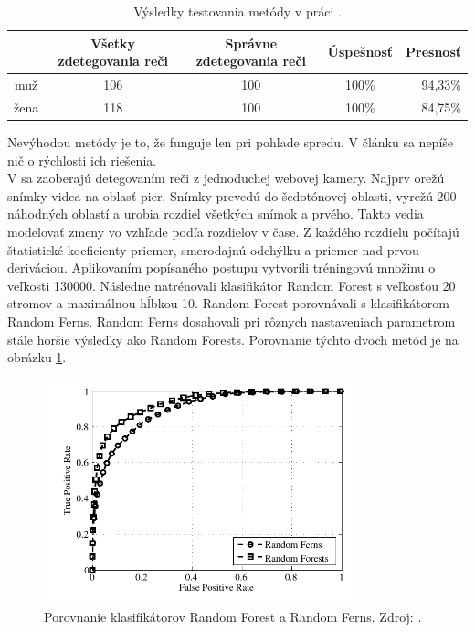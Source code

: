 \begin{table}[H]
	\begin{center}
		\begin{tabular}{|c|c|c|c|r|}
			\hline
			& Všetky zdetegovania reči & Správne zdetegovania reči & Úspešnosť & Presnosť \\
			\hline
			muž & 106 & 100 & 100\% & 94,33\%\\
			\hline
			žena & 118 & 100 & 100\% & 84,75\%\\
			\hline
		\end{tabular}
	\end{center}
	\caption{Výsledky testovania metódy v práci \cite{aoki2007voice}.}
	\label{tab-results}
\end{table}

Nevýhodou metódy je to, že funguje len pri pohľade spredu. V článku sa nepíše nič o rýchlosti ich riešenia.\\

V \cite{vieriu2014real} sa zaoberajú detegovaním reči z jednoduchej webovej kamery. 
Najprv orežú snímky videa na oblasť pier.
Snímky prevedú do šedotónovej oblasti, vyrežú 200 náhodných oblastí a urobia rozdiel všetkých snímok a prvého. 
Takto vedia modelovať zmeny vo vzhľade podľa rozdielov v čase.
Z každého rozdielu počítajú štatistické koeficienty priemer, smerodajnú odchýlku a priemer nad prvou deriváciou. 
Aplikovaním popísaného postupu vytvorili tréningovú množinu o veľkosti 130000.
Následne natrénovali klasifikátor Random Forest s veľkosťou 20 stromov a maximálnou hĺbkou 10. 
Random Forest porovnávali s klasifikátorom Random Ferns. 
Random Ferns dosahovali pri rôznych nastaveniach parametrom stále horšie výsledky ako Random Forests.
Porovnanie týchto dvoch metód je na obrázku \ref{pic-ferns&forests}.

\begin{figure}[H]
	\begin{center}
		\includegraphics[height=6.5cm]{pics/ferns&forests.png}
		\caption{Porovnanie klasifikátorov Random Forest a Random Ferns.
		Zdroj: \cite{vieriu2014real}.}
		\label{pic-ferns&forests}
	\end{center}
\end{figure}

